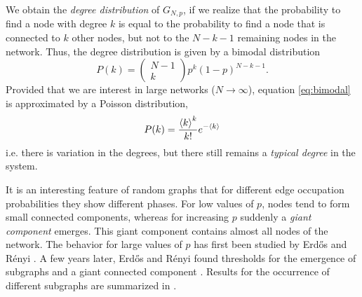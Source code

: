 We obtain the \emph{degree distribution} of $G_{N,p}$, if we realize that the probability to find a node with degree $k$ is equal to the probability to find a node that is connected to $k$ other nodes, but not to the $N-k-1$ remaining nodes in the network.
Thus, the degree distribution is given by a bimodal distribution
\begin{equation}\label{eq:bimodal}
P(k)= \left(\begin{array}{c}N-1 \\k\end{array}\right) p^k (1-p)^{N-k-1} .
\end{equation}
Provided that we are interest in large networks ($N\rightarrow \infty $), equation \eqref{eq:bimodal} is approximated by a Poisson distribution, 
\begin{equation}\label{eq:poisson_distribution}
P(k) =\frac{\left< k \right>^k }{k!} e^{-\left< k \right>}
\end{equation}
i.e. there is variation in the degrees, but there still remains a \emph{typical degree} in the system.

It is an interesting feature of random graphs that for different edge occupation probabilities they show different phases.
For low values of $p$, nodes tend to form small connected components, whereas for increasing $p$ suddenly a \emph{giant component} emerges.
This giant component contains almost all nodes of the network.
The behavior for large values of $p$ has first been studied by Erd\H{o}s and R\'enyi \citep{ER:1959}.
A few years later, Erd\H{o}s and R\'enyi found thresholds for the emergence of subgraphs and a giant connected component \citep{ER:1960,ER:1961}.
Results for the occurrence of different subgraphs are summarized in \citep{RevModPhys.74}.

